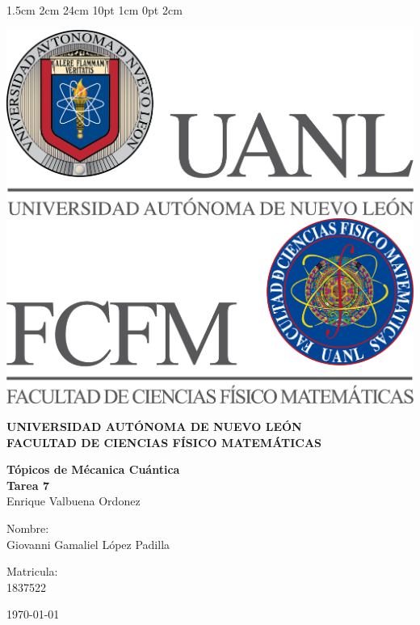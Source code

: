 \documentclass[12pt,letterpaper]{report}
\begin{document}
\setmargins{2.5cm}      
{1.5cm}                     
{2cm}  
{24cm}                    
{10pt}                          
{1cm}                          
{0pt}                             
{2cm}
\begin{titlepage}
\begin{center}
\includegraphics[scale=0.40]{../../Logos/uanl.png} 
\hspace{2.5cm}
\includegraphics[scale=0.40]{../../Logos/fcfm.png}
\end{center}
\vspace{2cm}
\begin{center}
\textbf{
UNIVERSIDAD AUTÓNOMA DE NUEVO LEÓN\\
FACULTAD DE CIENCIAS
    FÍSICO MATEMÁTICAS}\\
\vspace*{2cm}
\begin{large}
\vspace{1cm}
\large{\textbf{Tópicos de Mécanica Cuántica}}\\
\textbf{Tarea 7}\\
Enrique Valbuena Ordonez\\
\end{large}
\vspace{3.5cm}
\begin{minipage}{0.6\linewidth}
\vspace{0.5cm}
\changefontsizes{14pt}
Nombre:\\
Giovanni Gamaliel López Padilla\\
\end{minipage}
\begin{minipage}{0.2\linewidth}
\changefontsizes{14pt}
Matricula:\\
1837522
\end{minipage}
\end{center}
\vspace{4cm}
\begin{flushright}
\today
\end{flushright}
\end{titlepage}
\end{document}
